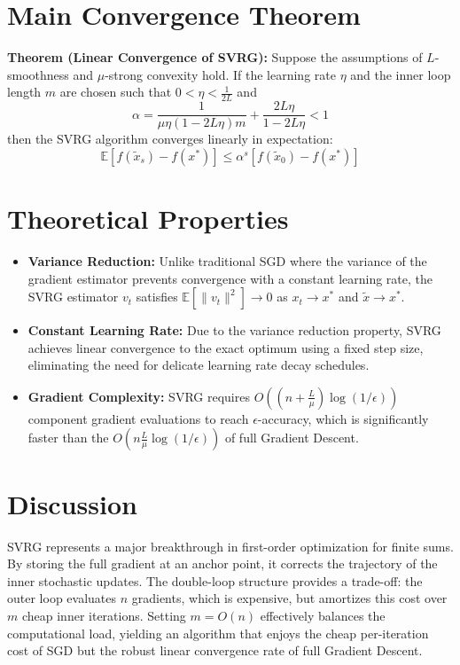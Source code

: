 \documentclass[11pt]{article}
\begin{document}
\section*{Main Convergence Theorem}
\textbf{Theorem (Linear Convergence of SVRG):} Suppose the assumptions of $L$-smoothness and $\mu$-strong convexity hold. If the learning rate $\eta$ and the inner loop length $m$ are chosen such that $0 < \eta < \frac{1}{2L}$ and 
\begin{equation}
    \alpha = \frac{1}{\mu \eta (1 - 2L\eta) m} + \frac{2L\eta}{1 - 2L\eta} < 1
\end{equation}
then the SVRG algorithm converges linearly in expectation:
\begin{equation}
    \mathbb{E}[f(\tilde{x}_s) - f(x^*)] \leq \alpha^s [f(\tilde{x}_0) - f(x^*)]
\end{equation}

\section*{Theoretical Properties}
\begin{itemize}
    \item \textbf{Variance Reduction:} Unlike traditional SGD where the variance of the gradient estimator prevents convergence with a constant learning rate, the SVRG estimator $v_t$ satisfies $\mathbb{E}[\|v_t\|^2] \to 0$ as $x_t \to x^*$ and $\tilde{x} \to x^*$.
    \item \textbf{Constant Learning Rate:} Due to the variance reduction property, SVRG achieves linear convergence to the exact optimum using a fixed step size, eliminating the need for delicate learning rate decay schedules.
    \item \textbf{Gradient Complexity:} SVRG requires $O((n + \frac{L}{\mu}) \log(1/\epsilon))$ component gradient evaluations to reach $\epsilon$-accuracy, which is significantly faster than the $O(n \frac{L}{\mu} \log(1/\epsilon))$ of full Gradient Descent.
\end{itemize}

\section*{Discussion}
SVRG represents a major breakthrough in first-order optimization for finite sums. By storing the full gradient at an anchor point, it corrects the trajectory of the inner stochastic updates. The double-loop structure provides a trade-off: the outer loop evaluates $n$ gradients, which is expensive, but amortizes this cost over $m$ cheap inner iterations. Setting $m = O(n)$ effectively balances the computational load, yielding an algorithm that enjoys the cheap per-iteration cost of SGD but the robust linear convergence rate of full Gradient Descent.
\end{document}
